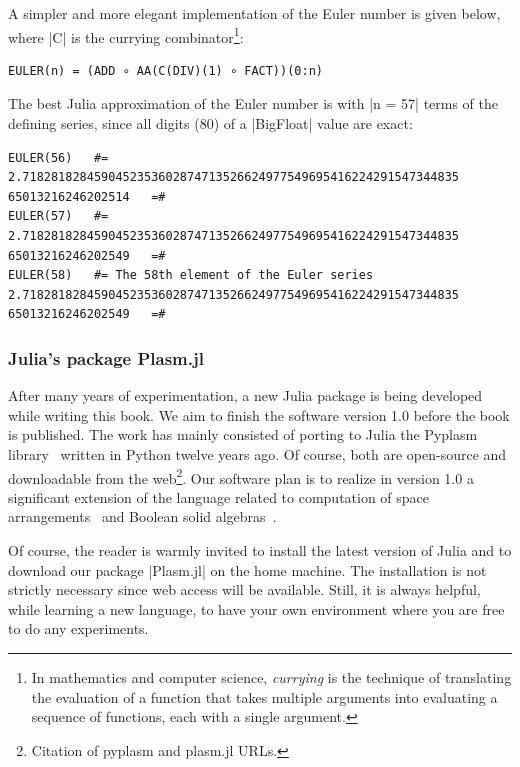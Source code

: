\begin{script}
\vspace{5mm}
A simpler and more elegant implementation of the Euler number is given below, 
where |C| is the currying combinator\footnote{
In mathematics and computer science, \emph{currying} is the technique of translating the evaluation of a function that takes multiple arguments into evaluating a sequence of functions, each with a single argument.}:
\begin{lstlisting}[language=JuliaLocal, style=julia, mathescape = true]
    EULER(n) = (ADD ∘ AA(C(DIV)(1) ∘ FACT))(0:n)
\end{lstlisting}

The best Julia approximation of the Euler number is with |n = 57| terms of the defining series, since all  digits (80) of a |BigFloat| value are exact:

\begin{lstlisting}[language=JuliaLocal, style=julia, mathescape = true]
EULER(56)	#=
2.7182818284590452353602874713526624977549695416224291547344835
65013216246202514	=#
EULER(57)	#=
2.7182818284590452353602874713526624977549695416224291547344835
65013216246202549	=#
EULER(58)	#= The 58th element of the Euler series
2.7182818284590452353602874713526624977549695416224291547344835
65013216246202549	=#
\end{lstlisting}
\end{script}




\subsubsection*{Julia’s package Plasm.jl}

After many years of experimentation, a new Julia package is being developed while writing this book. We aim to finish the software version 1.0 before the book is published. The work has mainly consisted of porting to Julia the  Pyplasm library~\cite{} written in Python twelve years ago. Of course, both are open-source and downloadable from the web\footnote{Citation of pyplasm and plasm.jl URLs.}. Our software plan is to realize in version 1.0 a significant extension of the language related to computation of space arrangements~\cite{} and Boolean solid algebras~\cite{}.

Of course, the reader is warmly invited to install the latest version of Julia and to download our package |Plasm.jl| on the home machine. The installation is not strictly necessary since web access will be available. Still, it is always helpful, while learning a new language, to have your own environment where you are free to do any experiments.


